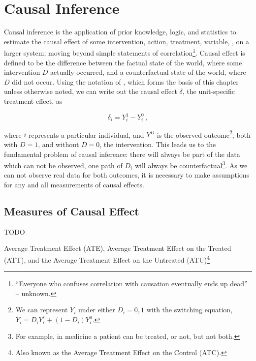\chapter{Causal Inference}
\label{chap:cause}

Causal inference is the application of prior knowledge, logic, and statistics
to estimate the causal effect of some intervention, action, treatment, variable, \etc, on a larger system;
moving beyond simple statements of correlation\footnote{``Everyone who confuses correlation with causation eventually ends up dead'' -- unknown.}.
Causal effect is defined to be the difference between
the factual state of the world, where some intervention $D$ actually occurred,
and a counterfactual state of the world, where $D$ did not occur.
Using the notation of \cite{CausalMixtape}, which forms the basis of this chapter unless otherwise noted,
we can write out the causal effect $\delta$, \ie the unit-specific treatment effect, as

\begin{equation}\label{eq:cause:causal_effect_delta}
\delta_{i} = Y_{i}^{1} - Y_{i}^{0}\,,
\end{equation}

\noindent where $i$ represents a particular individual,
and $Y^{D}$ is the observed outcome\footnote{We can represent
$Y_{i}$ under either $D_{i}=0,1$ with the switching equation,
$Y_{i} = D_{i} Y_{i}^{1} + \left(1-D_{i}\right) Y_{i}^{0}$.},
both with $D=1$, and without $D=0$, the intervention.
This leads us to the fundamental problem of causal inference:
there will always be part of the data which can not be observed,
\ie one path of $D_{i}$ will always be counterfactual\footnote{For example,
in medicine a patient can be treated, or not, but not both.}.
As we can not observe real data for both outcomes,
it is necessary to make assumptions for any and all measurements of causal effects. %

\section{Measures of Causal Effect}
\label{cause:measures}
TODO

Average Treatment Effect (ATE),
Average Treatment Effect on the Treated (ATT),
and the
Average Treatment Effect on the Untreated (ATU)\footnote{Also known as the Average Treatment Effect on the Control (ATC).}

